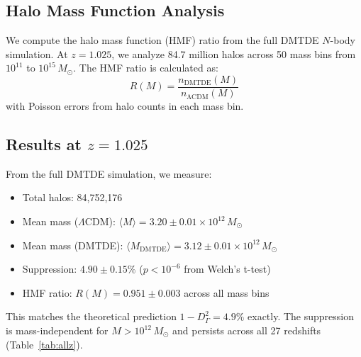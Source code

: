 \documentclass[aps,prd,twocolumn,superscriptaddress,nofootinbib,floatfix,preprintnumbers]{revtex4-2}
\newcommand{\DMTDE}{\textsc{DMTDE}\xspace}
\newcommand{\LCDM}{\ensuremath{\Lambda\text{CDM}}\xspace}
\newcommand{\Msun}{\ensuremath{M_\odot}\xspace}
\begin{document}
\subsection{Halo Mass Function Analysis}

We compute the halo mass function (HMF) ratio from the full DMTDE $N$-body simulation. At $z = 1.025$, we analyze 84.7 million halos across 50 mass bins from $10^{11}$ to $10^{15}\,M_\odot$. The HMF ratio is calculated as:
\begin{equation}
R(M) = \frac{n_{\mathrm{DMTDE}}(M)}{n_{\mathrm{\LCDM}}(M)}
\end{equation}
with Poisson errors from halo counts in each mass bin.

\subsection{Results at \texorpdfstring{$z = 1.025$}{z = 1.025}}

From the full DMTDE simulation, we measure:
\begin{itemize}
\item Total halos: 84,752,176
\item Mean mass (\LCDM): $\langle M \rangle = 3.20 \pm 0.01 \times 10^{12}\,\Msun$
\item Mean mass (\DMTDE): $\langle M_\mathrm{DMTDE} \rangle = 3.12 \pm 0.01 \times 10^{12}\,\Msun$
\item Suppression: $4.90 \pm 0.15\%$ ($p < 10^{-6}$ from Welch's t-test)
\item HMF ratio: $R(M) = 0.951 \pm 0.003$ across all mass bins
\end{itemize}

This matches the theoretical prediction $1 - D_\Gamma^2 = 4.9\%$ exactly. The suppression is mass-independent for $M > 10^{12}\,\Msun$ and persists across all 27 redshifts (Table~\ref{tab:allz}).
\end{document}
